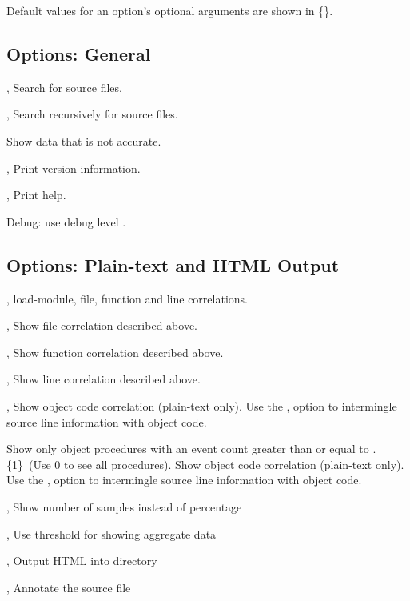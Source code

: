 \documentclass[english]{article}
\begin{document}
Default values for an option's optional arguments are shown in \{\}.

\subsection{Options: General}

\begin{Description}
\item[\OptArg{-d}{dir}, \OptArg{--directory}{dir}] Search  for source files.
\item[\OptArg{-D}{dir}, \OptArg{--recursive-directory}{dir}] Search  recursively for source files.
\item[\Opt{--force}] Show data that is not accurate.
\item[\Opt{-V}, \Opt{--version}] Print version information.
\item[\Opt{-h}, \Opt{--help}] Print help.
\item[\OptArg{--debug}{n}]   Debug: use debug level .
\end{Description}

\subsection{Options: Plain-text and HTML Output}
\begin{Description}
  \item[\Opt{-e}, \Opt{--everything}] load-module, file, function and line correlations.
  \item[\Opt{-f}, \Opt{--files}] Show file correlation described above.
  \item[\Opt{-r}, \Opt{--funcs}] Show function correlation described above.
  \item[\Opt{-l}, \Opt{--lines}] Show line correlation described above.

  \item[\Opt{-o}, \Opt{--object}] Show object code correlation (plain-text only).  Use the ,  option to intermingle source line information with object code.
  \item[\Opt{--othreshold}] Show only object procedures with an event count greater than or equal to .  \{1\}\  (Use 0 to see all procedures).
Show object code correlation (plain-text only).  Use the ,  option to intermingle source line information with object code.

  \item[\Opt{-n}, \Opt{--number}] Show number of samples instead of percentage
  \item[\OptArg{-s}{n}, \OptArg{--show}{n}] Use threshold  for showing aggregate data

  \item[\OptArg{-H}{dir}, \OptArg{--html}{dir}] Output HTML into directory 
  \item[\OptArg{-a}{file}, \OptArg{--annotate}{file}] Annotate the source file 
\end{Description}
\end{document}
